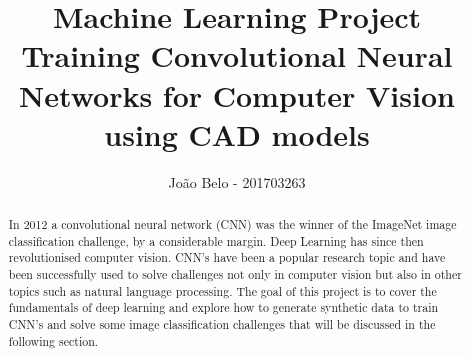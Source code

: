 \documentclass[10pt,a4paper]{article}
\title{\textbf{Machine Learning Project} \\ Training Convolutional Neural Networks for Computer Vision using CAD models}
\author{João Belo - 201703263}
\begin{document}
\maketitle
\begin{abstract}
In 2012 a convolutional neural network (CNN)\cite{krizhevsky2012imagenet} was the winner of the ImageNet image classification challenge, by a considerable margin. Deep Learning has since then revolutionised computer vision. CNN's have been a popular research topic and have been successfully used to solve challenges not only in computer vision but also in other topics such as natural language processing. The goal of this project is to cover the fundamentals of deep learning and explore how to generate synthetic data to train CNN's and solve some image classification challenges that will be discussed in the following section.
\end{abstract}
\end{document}
